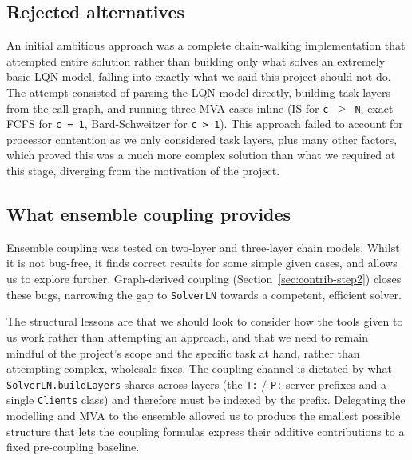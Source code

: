 

\subsection{Rejected alternatives}

An initial ambitious approach was a complete chain-walking implementation that attempted entire solution rather than building only what solves an extremely basic LQN model, falling into exactly what we said this project should not do. The attempt consisted of parsing the LQN model directly, building task layers from the call graph, and running three MVA cases inline (IS for \texttt{c $\geq$ N}, exact FCFS for \texttt{c = 1}, Bard-Schweitzer for \texttt{c > 1}). This approach failed to account for processor contention as we only considered task layers, plus many other factors, which proved this was a much more complex solution than what we required at this stage, diverging from the motivation of the project. 

\subsection{What ensemble coupling provides}

Ensemble coupling was tested on two-layer and three-layer chain models. Whilst it is not bug-free, it finds correct results for some simple given cases, and allows us to explore further. Graph-derived coupling (Section~\ref{sec:contrib-step2}) closes these bugs, narrowing the gap to \texttt{SolverLN} towards a competent, efficient solver.

The structural lessons are that we should look to consider how the tools given to us work rather than attempting an approach, and that we need to remain mindful of the project's scope and the specific task at hand, rather than attempting complex, wholesale fixes. The coupling channel is dictated by what \texttt{SolverLN.buildLayers} shares across layers (the \texttt{T:} / \texttt{P:} server prefixes and a single \texttt{Clients} class) and therefore must be indexed by the prefix. Delegating the modelling and MVA to the ensemble allowed us to produce the smallest possible structure that lets the coupling formulas express their additive contributions to a fixed pre-coupling baseline.



